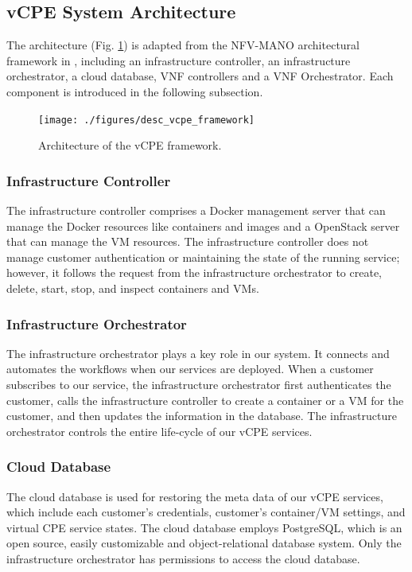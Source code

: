 \documentclass[conference]{IEEEtran}
\begin{document}
\subsection{vCPE System Architecture}
The architecture (Fig. \ref{fig:desc_vcpe_framework}) is adapted from the NFV-MANO architectural framework in \cite{nfv2014-v111}, including an infrastructure controller, an infrastructure orchestrator, a cloud database, VNF controllers and a VNF Orchestrator. Each component is introduced in the following subsection.

\begin{figure}[!t]
\centering
\texttt{[image: ./figures/desc\_vcpe\_framework]}
\caption{Architecture of the vCPE framework.}
\label{fig:desc_vcpe_framework}
\end{figure}

\subsubsection{Infrastructure Controller}

The infrastructure controller comprises a Docker management server that can manage the Docker resources like containers and images and a OpenStack server that can manage the VM resources. The infrastructure controller does not manage customer authentication or maintaining the state of the running service; however, it follows the request from the infrastructure orchestrator to create, delete, start, stop, and inspect containers and VMs.

\subsubsection{Infrastructure Orchestrator}

The infrastructure orchestrator plays a key role in our system. It connects and automates the workflows when our services are deployed. When a customer subscribes to our service, the infrastructure orchestrator first authenticates the customer, calls the infrastructure controller to create a container or a VM for the customer, and then updates the information in the database. The infrastructure orchestrator controls the entire life-cycle of our vCPE services.

\subsubsection{Cloud Database}
The cloud database is used for restoring the meta data of our vCPE services, which include each customer’s credentials, customer’s container/VM settings, and virtual CPE service states. The cloud database employs PostgreSQL, which is an open source, easily customizable and object-relational database system. Only the infrastructure orchestrator has permissions to access the cloud database.
\end{document}
